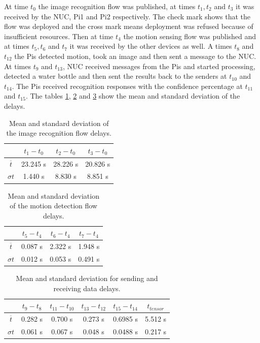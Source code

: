 \noindent At time $t_0$ the image recognition flow was published, at times $t_1, t_2$ and   $t_3$ it was received by the NUC, Pi1 and Pi2 respectively. The check mark shows that the flow was deployed and the cross mark means deployment was refused because of insufficient resources. Then at time $t_4$ the motion sensing flow was published and at times $t_5,t_6$ and $t_7$ it was received by the other devices as well. A times $t_8$ and $t_{12}$  the Pis detected motion, took an image and then sent a message to the NUC. At times $t_9$ and $t_{13}$,  NUC received messages from the Pis and started processing, detected a water bottle and then sent the  results back to the senders at $t_{10}$ and $t_{14}$. The Pis received recognition responses with the confidence percentage at $t_{11}$ and $t_{15}$.  The tables \ref{table:tensor}, \ref{table:motion} and \ref{table:data} show the mean and standard deviation of the delays.  
\begin{table}[H]
\centering
\begin{tabular}{c|c|c|c}\toprule
&$t_1 - t_0$  & $t_2 - t_0$  & $t_3-t_0$ \\ \midrule
$ \overline{t} $&	23.245 s&28.226 s&20.826 s\\ 
$ \sigma t $ &1.440 s&8.830 s&8.851 s\\
\end{tabular}
\caption{Mean and standard deviation of the image recognition flow delays.}
\label{table:tensor}
\end{table}


\begin{table}[H]
\centering
\begin{tabular}{c|c|c|c}\toprule
&$t_5 - t_4$  & $t_6 - t_4$  & $t_7-t_4$ \\ \midrule
$ \overline{t} $ &0.087 s&2.322 s&1.948 s\\
$ \sigma t $&0.012 s&0.053 s&0.491 s\\
\end{tabular}
\caption{Mean and standard deviation of the motion detection flow delays.}
\label{table:motion}
\end{table}

\begin{table}[H]
\centering
\begin{tabular}{c|c|c|c|c|c}	\toprule
&$t_9 - t_8$  & $t_{11} - t_{10}$  & $t_{13}-t_{12}$ & $t_{15}-t_{14}$&  $t_{tensor}$ \\ \midrule
$ \overline{t} $&0.282 s&0.700 s&	0.273 s&0.6985 s&5.512 s\\
$ \sigma t $&0.061 s&0.067 s&	0.048 s&0.0488 s&0.217 s\\
	\end{tabular}
	\caption{Mean and standard deviation for sending and receiving data delays.}
	\label{table:data}
\end{table}

